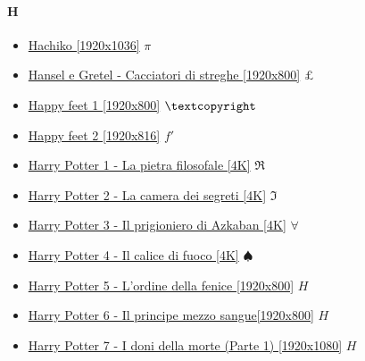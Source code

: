 	\paragraph{H} \hypertarget{FIH}{}
	
		\begin{itemize}
			\item \href{https://mega.nz/#!IQwGiTRS!3-jpobggSF6EFVT5cUU0QBbPm0CTHLlTGqxxRHh290I} {Hachiko [1920x1036]}  $\pi$ \\ 
			\item \href{https://mega.nz/#!LypR2TKR!f1I__pHve_b_6yh6Sme3iKS-1yNvHkb4XaNtgn6zwbM} {Hansel e Gretel - Cacciatori di streghe [1920x800]}  $\pounds$ \\ 
			\item \href{https://mega.nz/#!eahEhSLb!6op5tAa79a18ZHOh-KG4ecozv42-2AN9O3B3gXj0ozk} {Happy feet 1 [1920x800]}  $\textcopyright$ \\ 
			\item \href{https://mega.nz/#!zj5UDLzC!2QnfC26Yo4p-g6UXFc1ZnhJt6WN9bdYhv395puTdkFk} {Happy feet 2 [1920x816]}  $f'$ \\ 
			\item \href{https://mega.nz/#!nbQE0RKL!cbspGgaDnxhbJ0gI2YwOiXejk4p00hrul8TdorMv5Ck} {Harry Potter 1 - La pietra filosofale [4K]}  $\Re$ \\ 
			\item \href{https://mega.nz/#!aPRXjRbK!ZvAIvMEyKUKckrbP89dwfIQYoX6VF4l-8k4crHFgfMo} {Harry Potter 2 - La camera dei segreti [4K]}  $\Im$ \\ 
			\item \href{https://mega.nz/#!v6AVGLiI!OThErQeyE3k6VTsh3wtxL7cxDz9DRXCCMFAH-YPncVI} {Harry Potter 3 - Il prigioniero di Azkaban [4K]}  $\forall$ \\ 
			\item \href{https://mega.nz/#!jXhS0IDZ!EIlhH6Su04vEvJssKHo0veJWFhetKw_RIBI1QF0Rns0} {Harry Potter 4 - Il calice di fuoco [4K]}  $\spadesuit$ \\ 
			\item \href{https://mega.nz/#!K1oXBYCL!LvhA3IlmvhSArcsIxvuMA3C_nDCss8W6dnxDgWl4BQg} {Harry Potter 5 - L'ordine della fenice [1920x800]}  $H$ \\ 
			\item \href{https://mega.nz/#!6kYz1JpL!pyOCUDGLVNaVqhvMuC3FJh_W_8CokC1BMexw9G4l_do} {Harry Potter 6 - Il principe mezzo sangue[1920x800]}  $H$ \\ 
			\item \href{https://mega.nz/#!vwogRQSA!0U2XsRNHe9QsTwC-POZEZuPwawdFT6AdEDxUXVHk5AA} {Harry Potter 7 - I doni della morte (Parte 1) [1920x1080]}  $H$ \\ 

\end{itemize}
